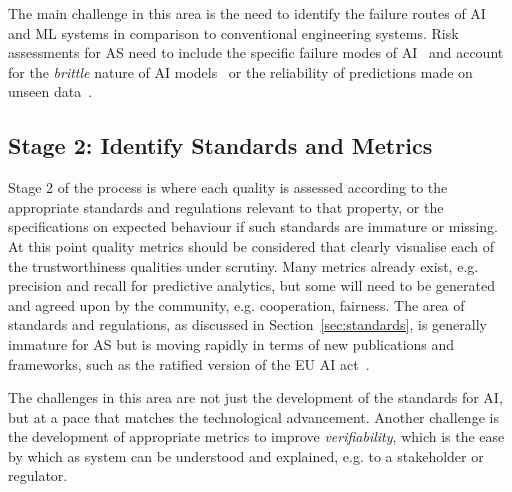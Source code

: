 The main challenge in this area is the need to identify the failure routes of AI and ML systems in comparison to conventional engineering systems. Risk assessments for AS need to include the specific failure modes of AI~\cite{piorkowski2023quantitative} and account for the \emph{brittle} nature of AI models~\cite{druce2021brittle} or the reliability of predictions made on unseen data~\cite{wing2021trustworthy}. 


\subsection{Stage 2: Identify Standards and Metrics}

Stage 2 of the process is where each quality is assessed according to the appropriate standards and regulations relevant to that property, or the specifications on expected behaviour if such standards are immature or missing. 
%
At this point quality metrics should be considered that clearly visualise each of the trustworthiness qualities under scrutiny. 
%
Many metrics already exist, e.g. precision and recall for predictive analytics, but some will need to be generated and agreed upon by the community, e.g. cooperation, fairness. 
%
The area of standards and regulations, as discussed in Section~\ref{sec:standards}, is generally immature for AS but is moving rapidly in terms of new publications and frameworks, such as the ratified version of the EU AI act~\cite{EUAIact2021}. 

The challenges in this area are not just the development of the standards for AI, but at a pace that matches the technological advancement. 
%
Another challenge is the development of appropriate metrics to improve \emph{verifiability}, which is the ease by which as system can be understood and explained, e.g. to a stakeholder or regulator. 

